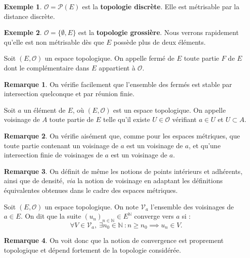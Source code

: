 \documentclass[french]{article}
\newcommand{\N}{\mathbb{N}}
\theoremstyle{plain}
\theoremstyle{definition}
\newtheorem*{ex}{Exemple}
\newtheorem*{rmq}{Remarque}
\theoremstyle{remark}
\begin{document}
\begin{ex}
	$\mathcal{O}=\mathcal{P}(E)$ est la \textbf{topologie discrète}. Elle est métrisable par la distance discrète.
\end{ex}

\begin{ex}
	$\mathcal{O}=\{\emptyset,E\}$ est la \textbf{topologie grossière}. Nous verrons rapidement qu'elle est non métrisable dès que $E$ possède plus de deux éléments.
\end{ex}

\begin{dfn}
	Soit $(E,\mathcal{O})$ un espace topologique. On appelle fermé de $E$ toute partie $F$ de $E$ dont le complémentaire dans $E$ appartient à $\mathcal{O}$.
\end{dfn}

\begin{rmq}
	On vérifie facilement que l'ensemble des fermés est stable par intersection quelconque et par réunion finie.
\end{rmq}

\begin{dfn}
	Soit $a$ un élément de $E$, où $(E,\mathcal{O})$ est un espace topologique. On appelle voisinage de $A$ toute partie de $E$ telle qu'il existe $U\in\mathcal{O}$ vérifiant $a\in U$ et $U\subset A$.
\end{dfn}

\begin{rmq}
	On vérifie aisément que, comme pour les espaces métriques, que toute partie contenant un voisinage de $a$ est un voisinage de $a$, et qu'une intersection finie de voisinages de $a$ est un voisinage de $a$.
\end{rmq}

\begin{rmq}
	On définit de même les notions de points intérieurs et adhérents, ainsi que de densité, \textit{via} la notion de voisinage en adaptant les définitions équivalentes obtenues dans le cadre des espaces métriques.
\end{rmq}

\begin{dfn}
	Soit $(E,\mathcal{O})$ un espace topologique. On note $\mathcal{V}_a$ l'ensemble des voisinages de $a\in E$. On dit que la suite $(u_n)_{n\in\N}\in E^\N$ converge vers $a$ si : $$\forall V\in\mathcal{V}_a,\ \exists n_0\in\N\ : n\geqslant n_0\implies u_n\in V.$$
\end{dfn}

\begin{rmq}
	On voit donc que la notion de convergence est proprement topologique et dépend fortement de la topologie considérée.
\end{rmq}
\end{document}
